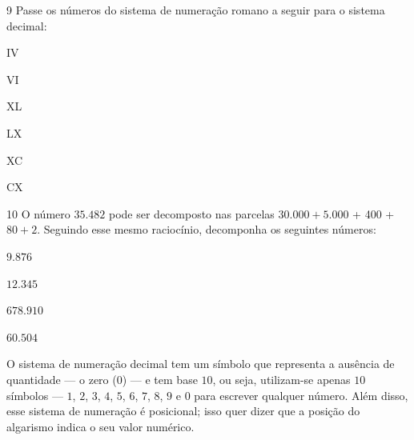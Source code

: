 {%

\num{9}  Passe os números do sistema de numeração romano a seguir para o
sistema decimal:

\begin{escolha}
\item IV 
\item VI 
\item XL 
\item LX 
\item XC 
\item CX 
\end{escolha}

\num{10}  O número $35.482$ pode ser decomposto nas parcelas $30.000 + 5.000$ +
400 + $80 + 2$. Seguindo esse mesmo raciocínio, decomponha os seguintes
números:

\begin{escolha}
\item $9.876$ 
\item $12.345$ 
\item $678.910$ 
\item $60.504$ 
\end{escolha}

\noindent O sistema de numeração decimal tem um símbolo
que representa a ausência de quantidade — o zero ($0$) — e tem base $10$,
ou seja, utilizam-se apenas $10$ símbolos — $1$, $2$, $3$, $4$, $5$, $6$, $7$, $8$, $9$ e $0$ para escrever qualquer número. Além disso, esse sistema de numeração é
posicional; isso quer dizer que a posição do algarismo indica o seu
valor numérico.

}
